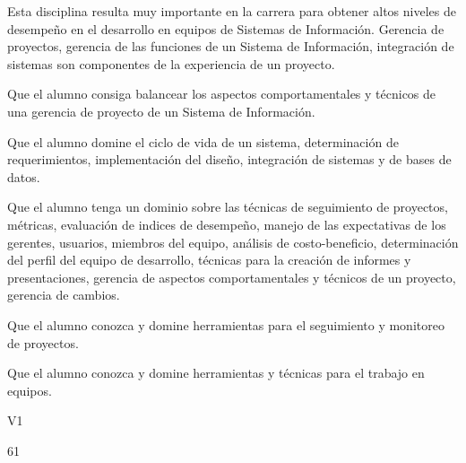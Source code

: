 \begin{syllabus}


\begin{justification}
Esta disciplina resulta muy importante en la carrera para obtener altos niveles de desempeño en el desarrollo en equipos de Sistemas de Información. Gerencia de proyectos, gerencia de las funciones de un Sistema de Información, integración de sistemas son componentes de la experiencia de un proyecto.
\end{justification}

\begin{goals}
\item Que el alumno consiga balancear los aspectos comportamentales y técnicos de una gerencia de proyecto de un Sistema de Información.
\item Que el alumno domine el ciclo de vida de un sistema, determinación de requerimientos, implementación del diseño, integración de sistemas y de bases de datos.
\item Que el alumno tenga un dominio sobre las técnicas de seguimiento de proyectos, métricas, evaluación de indices de desempeño, manejo de las expectativas de los gerentes, usuarios, miembros del equipo, análisis de costo-beneficio, determinación del perfil del equipo de desarrollo, técnicas para la creación de informes y presentaciones, gerencia de aspectos comportamentales y técnicos de un proyecto, gerencia de cambios.
\item Que el alumno conozca y domine herramientas para el seguimiento  y monitoreo de proyectos.
\item Que el alumno conozca y domine herramientas y técnicas para el trabajo en equipos.
\end{goals}

\begin{outcomes}{V1}
\end{outcomes}

\begin{unit}{\LUONEOHFIVEDef}{}{\LUONEOHFIVEBib}{6}{1}
   \begin{topics}
	\item \OMCONEOHTopicTWOxONEOHxONEOH
	\item \TDSSEVENTopicTHREExSEVENxTHREE
   \end{topics}
	\LUONEOHFIVEGoal
\end{unit}


\end{syllabus}
